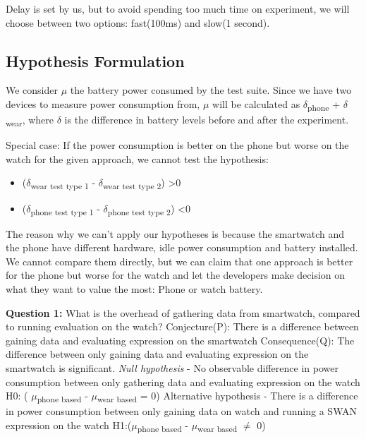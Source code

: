 Delay is set by us, but to avoid spending too much time on experiment, we will choose between two options: fast(100ms) and slow(1 second).

\subsection{ Hypothesis Formulation}

    We consider $\mu$ the battery power consumed by the test suite. Since we have two devices to measure power consumption from, 
    $\mu$ will be calculated as $\delta$\textsubscript{phone} +  $\delta$\textsubscript{wear}, where $\delta$ is the difference in battery levels 
    before and after the experiment.
    
    Special case:\label{special_case} If the power consumption is better on the phone but worse on the watch for the given approach, we cannot test the hypothesis:
    \begin{itemize}
     \item ($\delta$\textsubscript{wear test type 1} -  $\delta$\textsubscript{wear test type 2}) \textgreater  0
     \item  ($\delta$\textsubscript{phone test type 1} -  $\delta$\textsubscript{phone test type 2}) \textless  0 
    \end{itemize}
    
    The reason why we can't apply our hypotheses is because the smartwatch and the phone have different hardware, idle power consumption and 
    battery installed. We cannot compare them directly, but we can claim that one approach is better for the  phone but worse for the watch and let the developers
    make decision on what they want to value the most: Phone or watch battery.

    \textbf{Question 1:} What is the overhead of gathering data from smartwatch, compared to running evaluation on the watch? \newline
Conjecture(P): There is a difference between gaining data and evaluating expression on the smartwatch \newline
Consequence(Q): The difference between only gaining data and evaluating expression on the smartwatch is significant. \newline
\textit{Null hypothesis} - No observable difference in power consumption between only gathering data and evaluating expression on the watch \newline
H0: ( $\mu$\textsubscript{phone based} - $\mu$\textsubscript{wear based} = 0) \newline
  Alternative hypothesis - There is a difference in power consumption between only gaining data on watch and running a SWAN expression on the watch \newline
H1:($\mu$\textsubscript{phone based} - $\mu$\textsubscript{wear based} $\neq$ 0)  \newline

